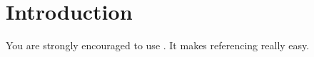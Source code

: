\section{Introduction}

You are strongly encouraged to use \LaTeXe{}. It makes referencing really easy\cite{day2012write}.